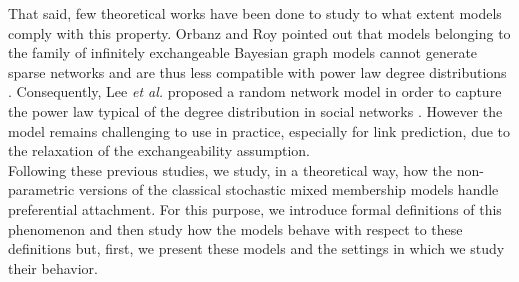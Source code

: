 That said, few theoretical works have been done to study to what extent models comply with this property. 
Orbanz and Roy  pointed out that models belonging to the family of infinitely exchangeable Bayesian graph models cannot generate sparse networks and are thus less compatible with power law degree distributions \cite{orbanz2015bayesian}. Consequently, Lee \textit{et al.}  proposed a random network model in order to capture the power law typical of the degree distribution in social networks \cite{Lee2015}. However the model remains challenging to use in practice, especially for link prediction, due to the relaxation of the exchangeability assumption.~\\


Following these previous studies, we study, in a theoretical way, how the non-parametric versions of the classical stochastic mixed membership models handle preferential attachment. For this purpose, we introduce formal definitions of this phenomenon and then study how the models behave with respect  to these definitions but, first,  we present these models and the settings in which we study their behavior.

